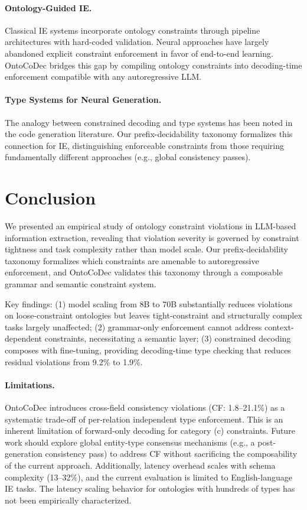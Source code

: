 \documentclass[11pt,a4paper]{article}
\begin{document}
\paragraph{Ontology-Guided IE.}
Classical IE systems incorporate ontology constraints through pipeline architectures with hard-coded validation. Neural approaches have largely abandoned explicit constraint enforcement in favor of end-to-end learning. OntoCoDec bridges this gap by compiling ontology constraints into decoding-time enforcement compatible with any autoregressive LLM.

\paragraph{Type Systems for Neural Generation.}
The analogy between constrained decoding and type systems has been noted in the code generation literature. Our prefix-decidability taxonomy formalizes this connection for IE, distinguishing enforceable constraints from those requiring fundamentally different approaches (e.g., global consistency passes).

\section{Conclusion}

We presented an empirical study of ontology constraint violations in LLM-based information extraction, revealing that violation severity is governed by constraint tightness and task complexity rather than model scale. Our prefix-decidability taxonomy formalizes which constraints are amenable to autoregressive enforcement, and OntoCoDec validates this taxonomy through a composable grammar and semantic constraint system.

Key findings: (1) model scaling from 8B to 70B substantially reduces violations on loose-constraint ontologies but leaves tight-constraint and structurally complex tasks largely unaffected; (2) grammar-only enforcement cannot address context-dependent constraints, necessitating a semantic layer; (3) constrained decoding composes with fine-tuning, providing decoding-time type checking that reduces residual violations from 9.2\% to 1.9\%.

\paragraph{Limitations.}
OntoCoDec introduces cross-field consistency violations (CF: 1.8--21.1\%) as a systematic trade-off of per-relation independent type enforcement. This is an inherent limitation of forward-only decoding for category (c) constraints. Future work should explore global entity-type consensus mechanisms (e.g., a post-generation consistency pass) to address CF without sacrificing the composability of the current approach. Additionally, latency overhead scales with schema complexity (13--32\%), and the current evaluation is limited to English-language IE tasks. The latency scaling behavior for ontologies with hundreds of types has not been empirically characterized.
\end{document}
